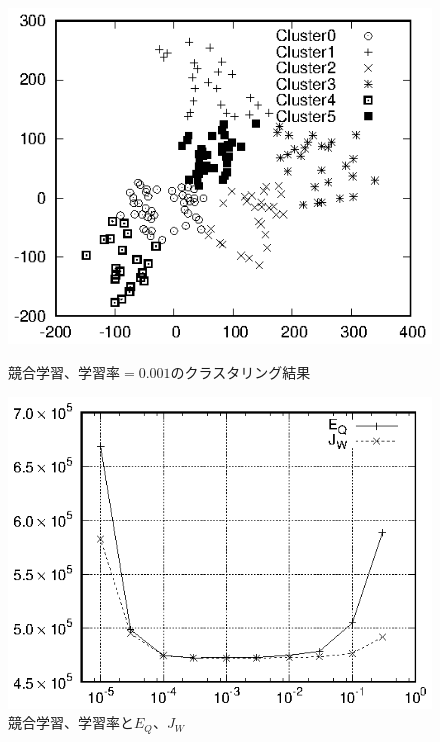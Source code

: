 \documentclass[a4j]{jarticle}
\begin{document}
\begin{figure}[tbp]
 \begin{minipage}{0.5\hsize}
  \begin{center}
   \includegraphics[width=\hsize]{fig/Hokkaido_xyl_compLearn.eps}
  \end{center}
  \caption{競合学習、学習率$=0.001$のクラスタリング結果}
  \label{fig:Hokkaido_xyl_compLearn}
 \end{minipage}
 \begin{minipage}{0.5\hsize}
  \begin{center}
   \includegraphics[width=\hsize]{fig/compLearn.eps}
  \end{center}
  \caption{競合学習、学習率と$E_Q$、$J_W$}
  \label{fig:compLearn}
 \end{minipage}
\end{figure}
\end{document}
